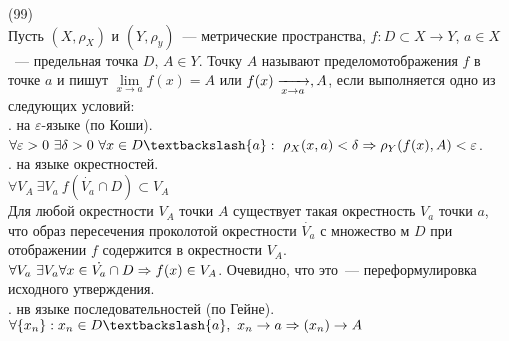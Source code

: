 (99)\\
Пусть $(X, \rho_X)$ и $(Y, \rho_y)$~--- метрические пространства, $f: D \subset X \to Y$, $a \in X$~--- предельная точка $D$, $A \in Y$. Точку $A$ называют пределомотображения $f$ в точке $a$ и пишут $\lim\limits_{x\to a}f(x) = A$ или $f(x)\xrightarrow[x\to a]{}, A$, если выполняется одно из следующих условий:\\
.  на $\varepsilon$-языке (по Коши).\\
$\forall \varepsilon > 0\ \exists\delta > 0\ \forall x \in D \bsl \{a\}:\ \rho_X(x, a) < \delta \Ra \rho_Y(f(x), A) < \varepsilon$.\\
.  на языке окрестностей.\\
$\forall V_A\ \exists V_a\ f(\dot{V_a} \cap D) \subset V_A$\\
Для любой окрестности $V_A$ точки $A$ существует такая окрестность $V_a$ точки $a$, что образ пересечения проколотой окрестности $\dot{V_a}$ с множество м $D$ при отображении $f$ содержится в окрестности $V_A$.\\
$\forall V_a\ \exists V_a \forall x \in \dot{V_a} \cap D \Rightarrow f(x) \in V_A$. Очевидно, что это~--- переформулировка исходного утверждения.\\
.  нв языке последовательностей (по Гейне).\\
$\forall \{x_n\}: x_n \in D \bsl \{a\},\ x_n \to a\Ra(x_n) \to A$